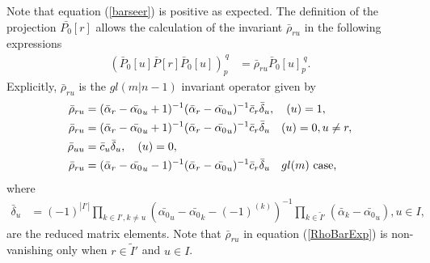\documentclass[12pt]{article}
\def\nn{\nonumber}
\begin{document}
Note that equation (\ref{barseer}) is positive as expected. The definition of the projection $\bar{P_0}[r]$ allows the calculation of the invariant $\bar{\rho}_{ru}$ in the following expressions \cite{GIW2}
\begin{align}
(\bar{P}_0[u]\bar{P}[r]\bar{P}_0[u])_p^{\ q} &= \bar{\rho}_{ru}\bar{P}_0[u]_p^{\ q}.
\end{align}
Explicitly, $\bar{\rho}_{ru}$ is the $gl(m|n-1)$ invariant operator given by
\begin{align}
\bar{\rho}_{ru} &= (\bar{\alpha}_r-\bar{\alpha_0}_u +
1)^{-1}(\bar{\alpha}_r-\bar{\alpha_0}_u)^{-1}\bar{c}_r\bar{\delta}_u, \ \ \ (u) = 1, \nn\\
\bar{\rho}_{ru} &= (\bar{\alpha}_r-\bar{\alpha_0}_u +
1)^{-1}(\bar{\alpha}_r-\bar{\alpha_0}_u)^{-1}\bar{c}_r\bar{\delta}_u \ \ \ (u) = 0, u \neq r,
\nn\\
\bar{\rho}_{uu} &= \bar{c}_u \bar{\delta}_u, \ \ \ (u) = 0, \nn\\
\bar{\rho}_{ru} &= (\bar{\alpha}_r-\bar{\alpha_0}_u -
1)^{-1}(\bar{\alpha}_r-\bar{\alpha_0}_u)^{-1}\bar{c}_r \bar{\delta}_u \ \ \ gl(m)
\hbox{~case,} 
\label{RhoBarExp}
\end{align}
where
\begin{align}
\bar{\delta}_u &= (-1)^{|I'|} \prod_{k\in I',k\neq u}\left(\bar{\alpha_0}_u - \bar{\alpha_0}_k -
(-1)^{(k)}\right)^{-1} \prod_{k\in \tilde{I}'}\left(\bar{\alpha}_k - \bar{\alpha_0}_u \right), u\in I, 
\end{align}
are the reduced matrix elements.
Note that $\bar{\rho}_{ru}$ in equation (\ref{RhoBarExp}) is non-vanishing only when $r\in \tilde{I}'$ and $u\in I$.
\end{document}
